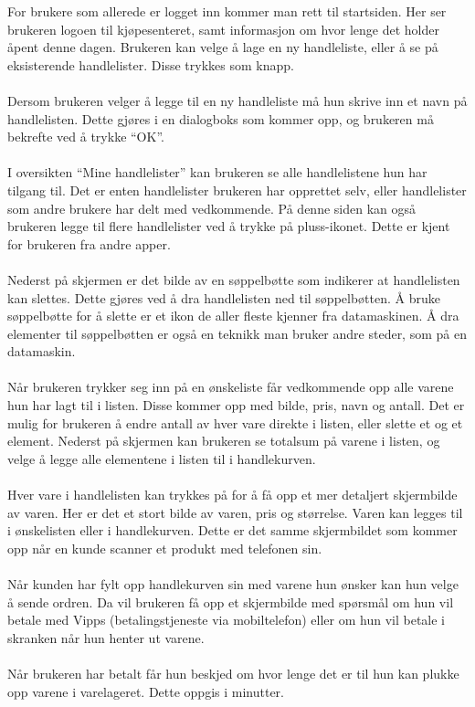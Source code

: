 For brukere som allerede er logget inn kommer man rett til startsiden. Her ser brukeren logoen til kjøpesenteret, samt informasjon om hvor lenge det holder åpent denne dagen. Brukeren kan velge å lage en ny handleliste, eller å se på eksisterende handlelister. Disse trykkes som knapp.
\\\\
Dersom brukeren velger å legge til en ny handleliste må hun skrive inn et navn på handlelisten. Dette gjøres i en dialogboks som kommer opp, og brukeren må bekrefte ved å trykke “OK”. 
\\\\
I oversikten “Mine handlelister” kan brukeren se alle handlelistene hun har tilgang til. Det er enten handlelister brukeren har opprettet selv, eller handlelister som andre brukere har delt med vedkommende. På denne siden kan også brukeren legge til flere handlelister ved å trykke på pluss-ikonet. Dette er kjent for brukeren fra andre apper.
\\\\
Nederst på skjermen er det bilde av en søppelbøtte som indikerer at handlelisten kan slettes. Dette gjøres ved å dra handlelisten ned til søppelbøtten. Å bruke søppelbøtte for å slette er et ikon de aller fleste kjenner fra datamaskinen. Å dra elementer til søppelbøtten er også en teknikk man bruker andre steder, som på en datamaskin.
\\\\
Når brukeren trykker seg inn på en ønskeliste får vedkommende opp alle varene hun har lagt til i listen. Disse kommer opp med bilde, pris, navn og antall. Det er mulig for brukeren å endre antall av hver vare direkte i listen, eller slette et og et element. Nederst på skjermen kan brukeren se totalsum på varene i listen, og velge å legge alle elementene i listen til i handlekurven.
\\\\
Hver vare i handlelisten kan trykkes på for å få opp et mer detaljert skjermbilde av varen. Her er det et stort bilde av varen, pris og størrelse. Varen kan legges til i ønskelisten eller i handlekurven. Dette er det samme skjermbildet som kommer opp når en kunde scanner et produkt med telefonen sin.
\\\\
Når kunden har fylt opp handlekurven sin med varene hun ønsker kan hun velge å sende ordren. Da vil brukeren få opp et skjermbilde med spørsmål om hun vil betale med Vipps (betalingstjeneste via mobiltelefon) eller om hun vil betale i skranken når hun henter ut varene.
\\\\
Når brukeren har betalt får hun beskjed om hvor lenge det er til hun kan plukke opp varene i varelageret. Dette oppgis i minutter.

